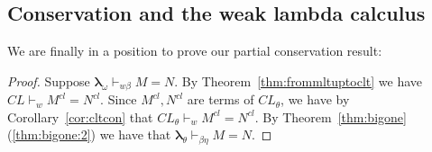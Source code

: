 \documentclass{lmcs} %
\newcommand{\param}{\theta}
\newcommand{\mlt}[1]{\boldsymbol\lambda_{#1}}
\newcommand{\mltup}{\boldsymbol\lambda_{\param}}
\newcommand{\mltpure}{\mlt{\omega}}
\newcommand{\cltup}{CL_{\param}}
\newcommand{\cltpure}{CL}
\begin{document}
\subsection{Conservation and the weak lambda calculus}\label{sec:pureclcompleteconserve}

We are finally in a position to prove our partial conservation result:

\thmconservemltpureovermltup*

\begin{proof}
Suppose $\mltpure\vdash_{w\beta} M=N$. By Theorem~\ref{thm:frommltuptoclt} we have $\cltpure \vdash_w M^{cl}=N^{cl}$. Since $M^{cl}, N^{cl}$ are terms of $\cltup$, we have by Corollary~\ref{cor:cltcon} that $\cltup \vdash_w M^{cl}=N^{cl}$. By Theorem~\ref{thm:bigone}(\ref{thm:bigone:2}) we have that $\mltup \vdash_{\beta\eta} M=N$. 
\end{proof}






\appendix
\end{document}
